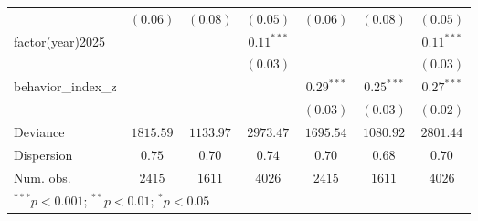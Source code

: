 \begin{tabular}{l c c c c c c}
                            & $(0.06)$      & $(0.08)$     & $(0.05)$      & $(0.06)$      & $(0.08)$     & $(0.05)$      \\
factor(year)2025            &               &              & $0.11^{***}$  &               &              & $0.11^{***}$  \\
                            &               &              & $(0.03)$      &               &              & $(0.03)$      \\
behavior\_index\_z          &               &              &               & $0.29^{***}$  & $0.25^{***}$ & $0.27^{***}$  \\
                            &               &              &               & $(0.03)$      & $(0.03)$     & $(0.02)$      \\
\midrule
Deviance                    & $1815.59$     & $1133.97$    & $2973.47$     & $1695.54$     & $1080.92$    & $2801.44$     \\
Dispersion                  & $0.75$        & $0.70$       & $0.74$        & $0.70$        & $0.68$       & $0.70$        \\
Num. obs.                   & $2415$        & $1611$       & $4026$        & $2415$        & $1611$       & $4026$        \\
\bottomrule
\multicolumn{7}{l}{\scriptsize{$^{***}p<0.001$; $^{**}p<0.01$; $^{*}p<0.05$}}
\end{tabular}
